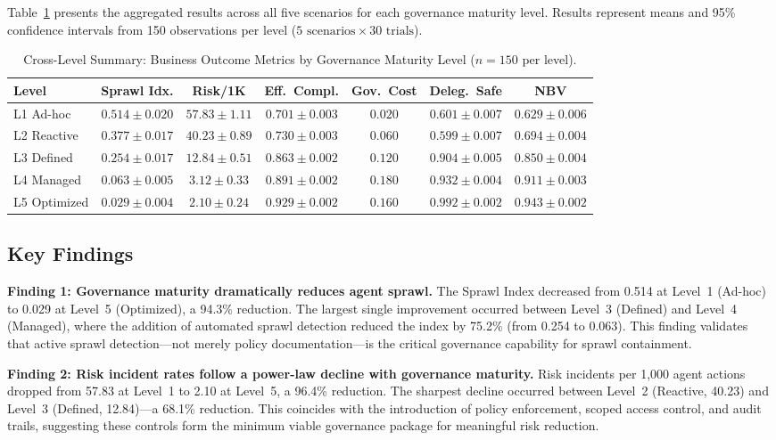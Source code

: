 \documentclass[ai,article,submit,pdftex,moreauthors]{Definitions/mdpi}
\begin{document}
Table~\ref{tab:crosslevel} presents the aggregated results across all five scenarios for each governance maturity level. Results represent means and 95\% confidence intervals from 150 observations per level ($5 \text{ scenarios} \times 30 \text{ trials}$).

\begin{table}[htbp]
\caption{Cross-Level Summary: Business Outcome Metrics by Governance Maturity Level ($n = 150$ per level).}\label{tab:crosslevel}
\centering
\small
\begin{tabular}{l c c c c c c}
\toprule
\textbf{Level} & \textbf{Sprawl Idx.} & \textbf{Risk/1K} & \textbf{Eff.\ Compl.} & \textbf{Gov.\ Cost} & \textbf{Deleg.\ Safe} & \textbf{NBV} \\
\midrule
L1 Ad-hoc    & $0.514 \pm 0.020$ & $57.83 \pm 1.11$ & $0.701 \pm 0.003$ & $0.020$ & $0.601 \pm 0.007$ & $0.629 \pm 0.006$ \\
L2 Reactive  & $0.377 \pm 0.017$ & $40.23 \pm 0.89$ & $0.730 \pm 0.003$ & $0.060$ & $0.599 \pm 0.007$ & $0.694 \pm 0.004$ \\
L3 Defined   & $0.254 \pm 0.017$ & $12.84 \pm 0.51$ & $0.863 \pm 0.002$ & $0.120$ & $0.904 \pm 0.005$ & $0.850 \pm 0.004$ \\
L4 Managed   & $0.063 \pm 0.005$ & $3.12 \pm 0.33$  & $0.891 \pm 0.002$ & $0.180$ & $0.932 \pm 0.004$ & $0.911 \pm 0.003$ \\
L5 Optimized & $0.029 \pm 0.004$ & $2.10 \pm 0.24$  & $0.929 \pm 0.002$ & $0.160$ & $0.992 \pm 0.002$ & $0.943 \pm 0.002$ \\
\bottomrule
\end{tabular}
\end{table}

\subsection{Key Findings}\label{sec:results-findings}

\textbf{Finding 1: Governance maturity dramatically reduces agent sprawl.} The Sprawl Index decreased from 0.514 at Level~1 (Ad-hoc) to 0.029 at Level~5 (Optimized), a 94.3\% reduction. The largest single improvement occurred between Level~3 (Defined) and Level~4 (Managed), where the addition of automated sprawl detection reduced the index by 75.2\% (from 0.254 to 0.063). This finding validates that active sprawl detection---not merely policy documentation---is the critical governance capability for sprawl containment.

\textbf{Finding 2: Risk incident rates follow a power-law decline with governance maturity.} Risk incidents per 1{,}000 agent actions dropped from 57.83 at Level~1 to 2.10 at Level~5, a 96.4\% reduction. The sharpest decline occurred between Level~2 (Reactive, 40.23) and Level~3 (Defined, 12.84)---a 68.1\% reduction. This coincides with the introduction of policy enforcement, scoped access control, and audit trails, suggesting these controls form the minimum viable governance package for meaningful risk reduction.
\end{document}
